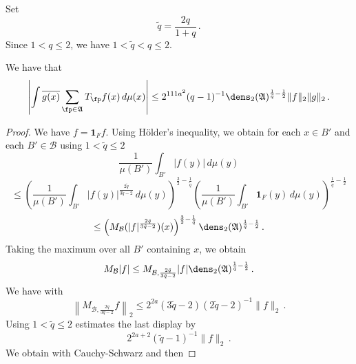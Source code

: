 Set
\begin{equation}
    \tilde{q}=\frac {2q}{1+q}\,.
\end{equation}
Since $1< q\le 2$, we have $1<\tilde{q}<q\le 2$.
\begin{lemma}
\label{dens2-antichain}
\leanok
We have that
\begin{equation}\label{eqttt9}
  \left|\int \overline{g(x)} \sum_{\fp \in \mathfrak{A}} T_{\fp} f(x)\, d\mu(x)\right|\le
  2^{111a^2}({q}-1)^{-1} \dens_2(\mathfrak{A})^{\frac 1{\tilde{q}}-\frac 12} \|f\|_2\|g\|_2\, .
\end{equation}
\end{lemma}
\begin{proof}
We have $f=\mathbf{1}_Ff$. Using H\"older's inequality, we obtain for
each $x\in B'$ and each $B'\in \mathcal{B}$ using $1<\tilde{q}\le 2$
\begin{equation}
    \frac 1{\mu(B')}\int_{B'} |f(y)|\, d\mu(y)
\end{equation}
\begin{equation}
    \le
    \left(\frac 1{\mu(B')}\int_{B'} |f(y)|^{\frac {2{\tilde{q}}}{3\tilde{q}-2}}\, d\mu(y)\right)^{\frac 32-\frac 1{\tilde{q}}}
    \left(\frac 1{\mu(B')}\int_{B'} \mathbf{1}_F(y)\, d\mu(y)\right)^{\frac 1{\tilde{q}}-\frac 12}
\end{equation}
\begin{equation}
    \le \left(M_{\mathcal{B}} (|f|^{\frac {2{\tilde{q}}}{3{\tilde{q}}-2}})(x)\right)^{\frac 32-\frac 1{\tilde{q}}}
\dens_2(\mathfrak{A})^{\frac 1{\tilde{q}}-\frac 12}\, .
\end{equation}
Taking the maximum over all $B'$ containing $x$, we obtain
\begin{equation} \label{eqttt1}
    M_{\mathcal{B}}|f|\le
    M_{\mathcal{B},\frac {2{\tilde{q}}}{3{\tilde{q}}-2} } |f|
    \dens_2(\mathfrak{A})^{\frac 1{\tilde{q}}-\frac 12}\, .
\end{equation}
We have with 
\begin{equation}
\left\|M_{\mathcal{B}, \frac {2q}{3q-2}} f\right\|_2\le 2^{2a}(3\tilde{q}-2)(2\tilde{q}-2)^{-1}\|f\|_2\, .
\end{equation}
Using $1<\tilde{q}\le 2$ estimates the last display by
\begin{equation}\label{eqttt2}
 2^{2a+2} (\tilde{q}-1)^{-1} \|f\|_2\, .
\end{equation}
We obtain with Cauchy-Schwarz
and then 

\end{proof}
